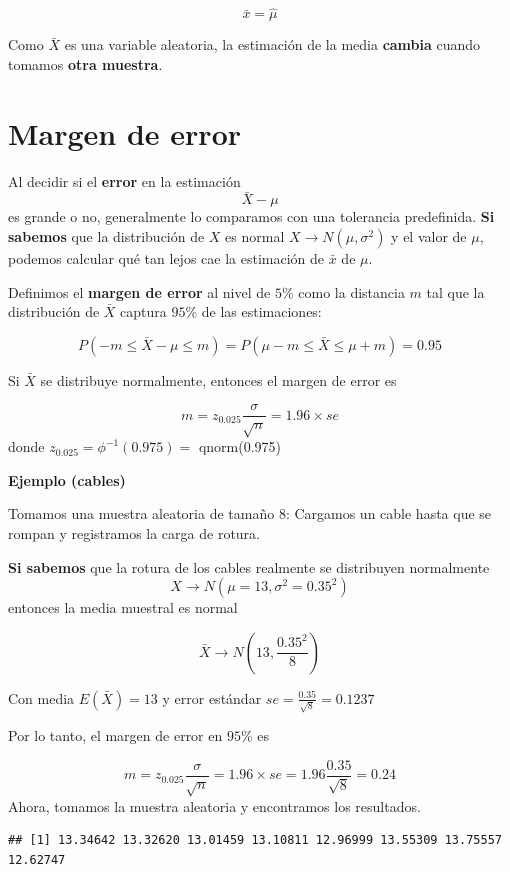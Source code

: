 \documentclass[
]{book}
\begin{document}
\[\bar{x}=\hat{\mu}\]

Como \(\bar{X}\) es una variable aleatoria, la estimación de la media \textbf{cambia} cuando tomamos \textbf{otra muestra}.

\hypertarget{margen-de-error-1}{%
\section{Margen de error}\label{margen-de-error-1}}

Al decidir si el \textbf{error} en la estimación \[\bar{X}-\mu\] es grande o no, generalmente lo comparamos con una tolerancia predefinida. \textbf{Si sabemos} que la distribución de \(X\) es normal \(X \rightarrow N(\mu, \sigma^2)\) y el valor de \(\mu\), podemos calcular qué tan lejos cae la estimación de \(\bar{x}\) de \(\mu\).

Definimos el \textbf{margen de error} al nivel de \(5\%\) como la distancia \(m\) tal que la distribución de \(\bar{X}\) captura \(95\%\) de las estimaciones:

\[P(-m \leq \bar{X}-\mu \leq m)=P(\mu-m \leq \bar{X} \leq\mu + m)=0.95\]

Si \(\bar{X}\) se distribuye normalmente, entonces el margen de error es

\[m=z_{0.025} \frac{\sigma}{\sqrt{n}}=1.96\times se\]
donde \(z_{0.025}=\phi^{-1}(0.975)=\) qnorm(0.975)

\textbf{Ejemplo (cables)}

Tomamos una muestra aleatoria de tamaño \(8\): Cargamos un cable hasta que se rompan y registramos la carga de rotura.

\textbf{Si sabemos} que la rotura de los cables realmente se distribuyen normalmente \[X \rightarrow N(\mu=13, \sigma^2=0.35^2)\] entonces la media muestral es normal

\[\bar{X} \rightarrow N(13, \frac{0.35^2}{8})\]

Con media \(E(\bar{X})=13\) y error estándar \(se=\frac{0.35}{\sqrt{8}}=0.1237\)

Por lo tanto, el margen de error en \(95\%\) es

\[m=z_{0.025} \frac{\sigma}{\sqrt{n}}=1.96\times se=1.96\frac{0.35}{\sqrt{8}}=0.24\]
Ahora, tomamos la muestra aleatoria y encontramos los resultados.

\begin{verbatim}
## [1] 13.34642 13.32620 13.01459 13.10811 12.96999 13.55309 13.75557 12.62747
\end{verbatim}
\end{document}
